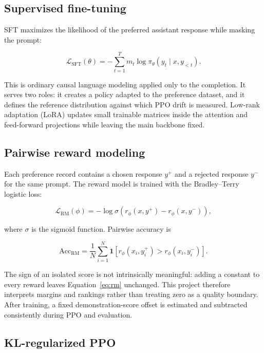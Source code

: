 \documentclass[11pt]{article}
\begin{document}
\subsection{Supervised fine-tuning}

SFT maximizes the likelihood of the preferred assistant response while
masking the prompt:

\begin{equation}
\mathcal{L}_{\mathrm{SFT}}(\theta)
=
-\sum_{t=1}^{T} m_t
\log \pi_\theta(y_t\mid x,y_{<t}).
\label{eq:sft}
\end{equation}

This is ordinary causal language modeling applied only to the completion. It
serves two roles: it creates a policy adapted to the preference dataset, and
it defines the reference distribution against which PPO drift is measured.
Low-rank adaptation (LoRA) \cite{hu2022} updates small trainable matrices
inside the attention and feed-forward projections while leaving the main
backbone fixed.

\subsection{Pairwise reward modeling}

Each preference record contains a chosen response $y^+$ and a rejected
response $y^-$ for the same prompt. The reward model is trained with the
Bradley--Terry logistic loss:

\begin{equation}
\mathcal{L}_{\mathrm{RM}}(\phi)
=
-\log \sigma\left(
r_\phi(x,y^+) - r_\phi(x,y^-)
\right),
\label{eq:rm}
\end{equation}

where $\sigma$ is the sigmoid function. Pairwise accuracy is

\begin{equation}
\mathrm{Acc}_{\mathrm{RM}}
=
\frac{1}{N}\sum_{i=1}^{N}
\mathbf{1}
\left[
r_\phi(x_i,y_i^+) > r_\phi(x_i,y_i^-)
\right].
\end{equation}

The sign of an isolated score is not intrinsically meaningful: adding a
constant to every reward leaves Equation~\ref{eq:rm} unchanged. This project
therefore interprets margins and rankings rather than treating zero as a
quality boundary. After training, a fixed demonstration-score offset is
estimated and subtracted consistently during PPO and evaluation.

\subsection{KL-regularized PPO}
\end{document}
